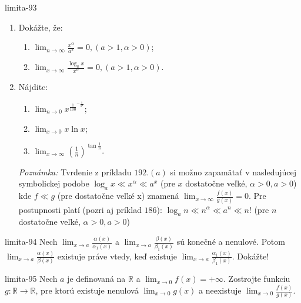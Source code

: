 \begin{defproblem}{limita-93}
\begin{enumerate}
\item Dokážte, že:
\begin{multicols}{2}
\begin{enumerate}
    \item $\lim_{n \rightarrow \infty} \frac{x^{\alpha}}{a^x}=0,(a>1,\alpha>0)$;
    \item $\lim_{x \rightarrow \infty} \frac{\log_a x}{x^\alpha}=0,(a>1,\alpha >0)$.
\end{enumerate}
\end{multicols}
\item Nájdite:
\begin{multicols}{2}
\begin{enumerate}
    \item $\lim_{n \rightarrow 0} x^{\frac{1}{100}^{-\frac{1}{x^2}}}$;
    \item $\lim_{x \rightarrow 0} x \ln x$;
    \item $\lim_{x \rightarrow \infty} (\frac{1}{n})^{\tan \frac{1}{n}}$.
\end{enumerate}
\end{multicols}
\textit{Poznámka:}
Tvrdenie z príkladu $192.(a)$ si možno zapamätať v nasledujúcej symbolickej podobe $\log_a x\ll x^\alpha \ll a^x$ (pre $x$ dostatočne veľké, $\alpha >0, a>0$)
kde $f\ll g$ (pre dostatočne veľké x) znamená $\lim_{x \rightarrow \infty} \frac{f(x)}{g(x)}=0$.
Pre postupnosti platí (pozri aj príklad $186$):
$\log_a n\ll n^\alpha\ll a^n\ll n!$ (pre $n$ dostatočne veľké,  $\alpha >0, a>0$)
\end{enumerate}
\end{defproblem}

\begin{defproblem}{limita-94}
Nech $\lim_{x \rightarrow a} \frac{\alpha (x)}{\alpha_1 (x)}$ a $\lim_{x \rightarrow a} \frac{\beta (x)}{\beta_1(x)}$ sú konečné a nenulové. Potom $\lim_{x \rightarrow a} \frac{\alpha (x)}{\beta (x)}$ existuje práve vtedy, keď existuje $\lim_{x \rightarrow a} \frac{\alpha_1 (x)}{\beta_1 (x)}$. Dokážte!
\end{defproblem}

\begin{defproblem}{limita-95}
Nech $a$ je definovaná na $\mathbb{R}$ a $\lim_{x \rightarrow 0} f(x)=+\infty$. Zostrojte funkciu $g: \mathbb{R} \rightarrow \mathbb{R}$, pre ktorú existuje nenulová $\lim_{x \rightarrow 0} g(x)$ a neexistuje $\lim_{x \rightarrow 0} \frac{f(x)}{g(x)}$.
\end{defproblem}

